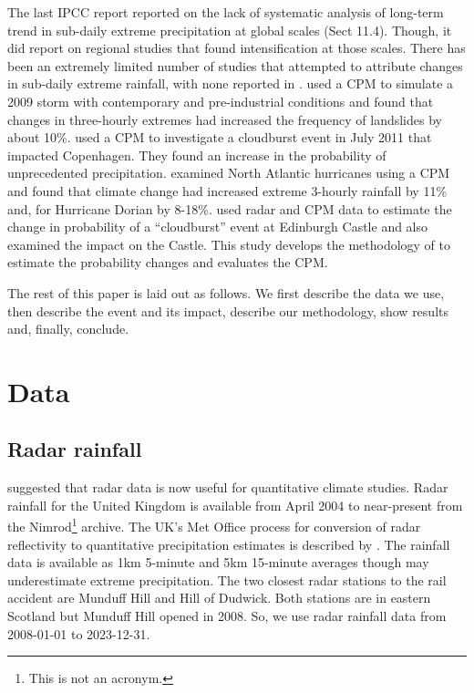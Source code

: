 \documentclass[11pt,a4paper]{article}
\begin{document}
The last IPCC report\parencite{Seneviratne2021ippcc_chapter_extremes} reported on the lack of systematic analysis of long-term trend in sub-daily extreme precipitation at global scales (Sect 11.4). Though, it did report on regional studies that found intensification at those scales.  There has  been an extremely limited number of studies that attempted to attribute changes in sub-daily extreme rainfall, with none reported in \cite{Seneviratne2021ippcc_chapter_extremes}.   \cite{mishra2023landslide}  used a  CPM to simulate a 2009 storm with contemporary and  pre-industrial conditions and found that changes in three-hourly extremes had increased the frequency of landslides by about 10\%. \cite{matte2022cloudburst}  used a CPM to investigate a cloudburst  event in July 2011 that impacted  Copenhagen. They found an increase in the probability of unprecedented precipitation.  \cite{Reed2022,Reed2021dorian_extreme_rain} examined North Atlantic hurricanes  using a CPM and found that climate change had increased extreme 3-hourly rainfall by 11\% and, for Hurricane Dorian by 8-18\%. \cite{tett2023edinburgh} used radar and CPM data to estimate the change in probability of a ``cloudburst'' event at Edinburgh Castle and also examined the impact on the Castle.  This study develops the methodology of \cite{tett2023edinburgh} to estimate the probability changes and evaluates the CPM. 

 
 
The rest of this paper is laid out as follows. We first describe the data we use,  then describe the event and its impact,  describe our methodology, show results and, finally,  conclude. 

\section{Data}
\label{sect:data}

\subsection{Radar rainfall}
\cite{saltikoff2019radar_climate} suggested that radar data is now useful for quantitative climate studies.  Radar rainfall for the United Kingdom is available from April 2004 to near-present\parencite{radar_data} from the Nimrod\footnote{This is not an acronym.} archive. The UK's Met Office process for conversion of radar reflectivity to quantitative precipitation estimates is described by \cite{harrison2000nimrod,Harrison2012,procedings:harrison15radarnet}. The rainfall data is available  as  1km 5-minute and 5km 15-minute  averages though may underestimate extreme precipitation\parencite{harrison2000nimrod}. The two closest radar stations to the rail accident are Munduff Hill and Hill of Dudwick. Both stations are in eastern Scotland but Munduff Hill opened in 2008. So,  we use radar rainfall  data from  2008-01-01 to 2023-12-31. 
\end{document}
